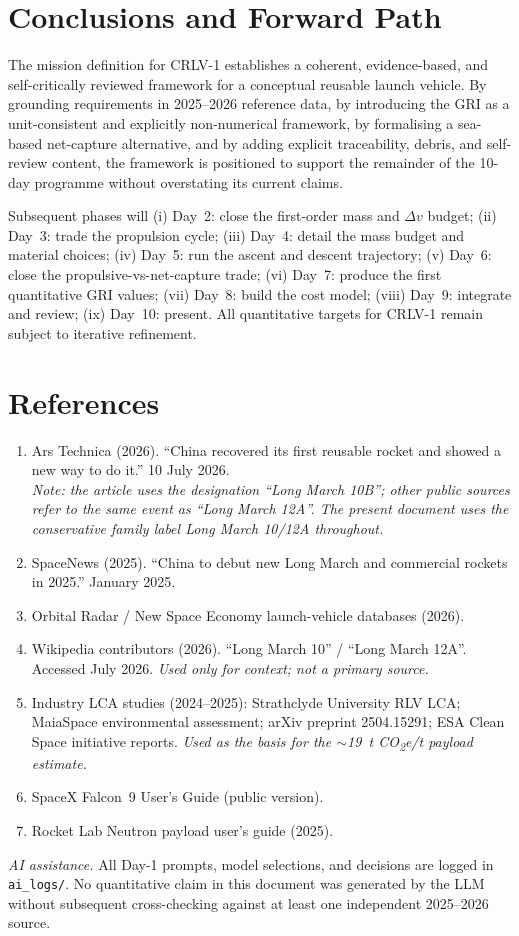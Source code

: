 \documentclass[10pt,a4paper]{article}
\begin{document}
\section{Conclusions and Forward Path}
The mission definition for CRLV-1 establishes a coherent, evidence-based, and self-critically reviewed framework for a conceptual reusable launch vehicle. By grounding requirements in 2025--2026 reference data, by introducing the GRI as a unit-consistent and explicitly non-numerical framework, by formalising a sea-based net-capture alternative, and by adding explicit traceability, debris, and self-review content, the framework is positioned to support the remainder of the 10-day programme without overstating its current claims.

Subsequent phases will (i) Day~2: close the first-order mass and $\Delta v$ budget; (ii) Day~3: trade the propulsion cycle; (iii) Day~4: detail the mass budget and material choices; (iv) Day~5: run the ascent and descent trajectory; (v) Day~6: close the propulsive-vs-net-capture trade; (vi) Day~7: produce the first quantitative GRI values; (vii) Day~8: build the cost model; (viii) Day~9: integrate and review; (ix) Day~10: present. All quantitative targets for CRLV-1 remain subject to iterative refinement.

\section*{References}
\begin{enumerate}[leftmargin=*]
    \item Ars Technica (2026). ``China recovered its first reusable rocket and showed a new way to do it.'' 10 July 2026. \\ \textit{Note: the article uses the designation ``Long March 10B''; other public sources refer to the same event as ``Long March 12A''. The present document uses the conservative family label \textit{Long March 10/12A} throughout.}
    \item SpaceNews (2025). ``China to debut new Long March and commercial rockets in 2025.'' January 2025.
    \item Orbital Radar / New Space Economy launch-vehicle databases (2026).
    \item Wikipedia contributors (2026). ``Long March 10'' / ``Long March 12A''. Accessed July 2026. \textit{Used only for context; not a primary source.}
    \item Industry LCA studies (2024--2025): Strathclyde University RLV LCA; MaiaSpace environmental assessment; arXiv preprint 2504.15291; ESA Clean Space initiative reports. \textit{Used as the basis for the $\sim$19~t CO\textsubscript{2}e/t payload estimate.}
    \item SpaceX Falcon~9 User's Guide (public version).
    \item Rocket Lab Neutron payload user's guide (2025).
\end{enumerate}

\vspace{1em}
\noindent\textit{AI assistance.} All Day-1 prompts, model selections, and decisions are logged in \texttt{ai\_logs/}. No quantitative claim in this document was generated by the LLM without subsequent cross-checking against at least one independent 2025--2026 source.
\end{document}
